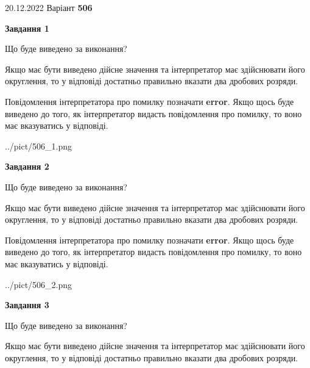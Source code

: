\documentclass[12pt, ukrainian]{article}
\begin{document}
{20.12.2022 Варіант \No \textbf { 506 }\par}
{
\begin {Large}

{\begin {center}\textbf{Завдання 1}\end {center}}\par
Що буде виведено за виконання? \par

Якщо має бути виведено дійсне значення та інтерпретатор має здійснювати його округлення, 
то у відповіді достатньо правильно вказати два дробових розряди.

Повідомлення інтерпретатора про помилку позначати \textbf{error}.
Якщо щось буде виведено до того, як інтерпретатор видасть повідомлення про помилку, 
то воно має вказуватись у відповіді. \par

\begin{center}
	{../pict/506_1.png}
\end{center}
\newpage

{\begin {center}\textbf{Завдання 2}\end {center}}\par
Що буде виведено за виконання? \par

Якщо має бути виведено дійсне значення та інтерпретатор має здійснювати його округлення, 
то у відповіді достатньо правильно вказати два дробових розряди.

Повідомлення інтерпретатора про помилку позначати \textbf{error}.
Якщо щось буде виведено до того, як інтерпретатор видасть повідомлення про помилку, 
то воно має вказуватись у відповіді. \par

\begin{center}
	{../pict/506_2.png}
\end{center}
\newpage

{\begin {center}\textbf{Завдання 3}\end {center}}\par
Що буде виведено за виконання? \par

Якщо має бути виведено дійсне значення та інтерпретатор має здійснювати його округлення, 
то у відповіді достатньо правильно вказати два дробових розряди.


\end{Large}}
\end{document}
